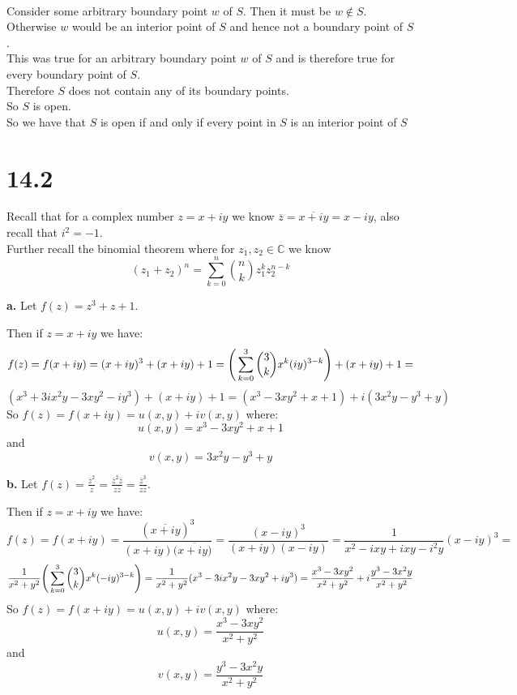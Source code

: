 \documentclass{article}
\begin{document}
\begin{center}
    \\Consider some arbitrary boundary point $w$ of $S$. Then it must be $w\notin S$.
    \\Otherwise $w$ would be an interior point of $S$ and hence not a boundary point of $S$.
    \\This was true for an arbitrary boundary point $w$ of $S$ and is therefore true for every boundary point of $S$.
    \\Therefore $S$ does not contain any of its boundary points.
    \\So $S$ is open.
    \break
    \\So we have that $S$ is open if and only if every point in $S$ is an interior point of $S$ \qedsymbol
\end{center}


\newpage
\section*{14.2}

\begin{center}
    \doublespacing
    Recall that for a complex number $z = x + iy$ we know $\overline{z} =\overline{x + iy} = x - iy$, also recall that $i^2 = -1$.
    \\Further recall the binomial theorem where for $z_1, z_2\in\mathbb{C}$ we know \[(z_1 + z_2)^n =\sum _{k=0}^n\binom{n}{k} z_1^k z_2^{n-k}\]
\end{center}

{\Large\textbf{a.}} Let $f(z) = z^3 + z + 1$.
\begin{center}
    \doublespacing
    Then if $z = x + iy$ we have: \[f(z) = f(x + iy) = (x + iy)^3 + (x + iy) + 1 =\Bigg{(}\sum _{k=0}^3\binom{3}{k} x^k (iy)^{3-k}\Bigg{)} + (x + iy) + 1 =\]
    \[(x^3 + 3ix^2 y - 3x y^2 - iy^3) + (x + iy) + 1 = (x^3 - 3x y^2 + x + 1) + i(3x^2 y - y^3 + y)\]
    So $f(z) = f(x + iy) = u(x, y) + iv(x, y)$ where:
    \[u(x, y) = x^3 - 3x y^2 + x + 1\]
    and
    \[v(x, y) = 3x^2 y - y^3 + y\]
\end{center}

{\Large\textbf{b.}} Let $f(z) =\frac{\overline{z}^2}{z} =\frac{\overline{z}^2\overline{z}}{z\overline{z}} =\frac{\overline{z}^3}{z\overline{z}}$.
\begin{center}
    \doublespacing
    Then if $z = x + iy$ we have: \[f(z) = f(x + iy) =\frac{(\overline{x + iy})^3}{(x + iy)(\overline{x + iy)}} =\frac{(x - iy)^3}{(x + iy)(x - iy)} =\frac{1}{x^2 - ixy + ixy - i^2 y} (x - iy)^3 =\]
    \[\frac{1}{x^2 + y^2}\Bigg{(}\sum _{k=0}^3\binom{3}{k} x^k (-iy)^{3-k}\Bigg{)} =\frac{1}{x^2 + y^2} (x^3 - 3i x^2 y - 3 x y^2 + iy^3) =\frac{x^3 - 3x y^2}{x^2 + y^2} + i\frac{y^3 - 3x^2 y}{x^2 + y^2}\]
    So $f(z) = f(x + iy) = u(x, y) + iv(x, y)$ where:
    \[u(x, y) =\frac{x^3 - 3x y^2}{x^2 + y^2}\]
    and
    \[v(x, y) =\frac{y^3 - 3x^2 y}{x^2 + y^2}\]
\end{center}
\end{document}

